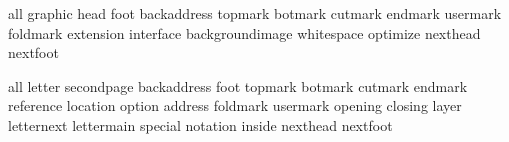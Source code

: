 



\unprotect


\startinterface all
           {graphic}
              {head}
              {foot}
       {backaddress}
           {topmark}
           {botmark}
           {cutmark}
           {endmark}
          {usermark}
          {foldmark}
         {extension}
         {interface}
   {backgroundimage}
        {whitespace}
          {optimize}
          {nexthead}
          {nextfoot}
\stopinterface

\startinterface all
        {letter}
    {secondpage}
   {backaddress}
          {foot}
       {topmark}
       {botmark}
       {cutmark}
       {endmark}
     {reference}
      {location}
        {option}
       {address}
      {foldmark}
      {usermark}
       {opening}
       {closing}
         {layer}
    {letternext}
    {lettermain}
       {special}
      {notation}
        {inside}
      {nexthead}
      {nextfoot}
\stopinterface

